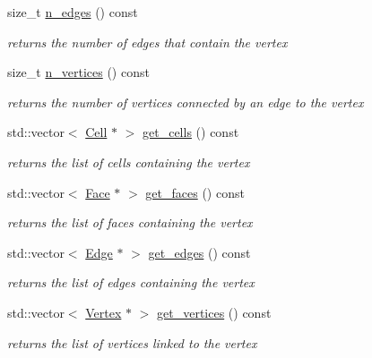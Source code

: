 \begin{DoxyCompactItemize}
size\+\_\+t \hyperlink{group__Mesh_ga66696dc0256731709df2562cd3186c5a}{n\+\_\+edges} () const
\begin{DoxyCompactList}\small\item\em returns the number of edges that contain the vertex \end{DoxyCompactList}\item 
size\+\_\+t \hyperlink{group__Mesh_ga586937c732852e91b1ddbe8d0df07899}{n\+\_\+vertices} () const
\begin{DoxyCompactList}\small\item\em returns the number of vertices connected by an edge to the vertex \end{DoxyCompactList}\item 
std\+::vector$<$ \hyperlink{classHArDCore3D_1_1Cell}{Cell} $\ast$ $>$ \hyperlink{group__Mesh_ga8127e549619aee2111dbf603e53cb5cb}{get\+\_\+cells} () const
\begin{DoxyCompactList}\small\item\em returns the list of cells containing the vertex \end{DoxyCompactList}\item 
std\+::vector$<$ \hyperlink{classHArDCore3D_1_1Face}{Face} $\ast$ $>$ \hyperlink{group__Mesh_gaa325f9d26be25eef1d69f8bef98490c3}{get\+\_\+faces} () const
\begin{DoxyCompactList}\small\item\em returns the list of faces containing the vertex \end{DoxyCompactList}\item 
std\+::vector$<$ \hyperlink{classHArDCore3D_1_1Edge}{Edge} $\ast$ $>$ \hyperlink{group__Mesh_gaa573992f8b8942be8f665ca0670cb738}{get\+\_\+edges} () const
\begin{DoxyCompactList}\small\item\em returns the list of edges containing the vertex \end{DoxyCompactList}\item 
std\+::vector$<$ \hyperlink{classHArDCore3D_1_1Vertex}{Vertex} $\ast$ $>$ \hyperlink{group__Mesh_gae2f7c53199b70d404213a3290c1e362e}{get\+\_\+vertices} () const
\begin{DoxyCompactList}\small\item\em returns the list of vertices linked to the vertex \end{DoxyCompactList}\item 
\mbox{\label{classHArDCore3D_1_1Vertex_a5054b903ff91506cc7d75afa44fd864b}} 

\end{DoxyCompactItemize}

